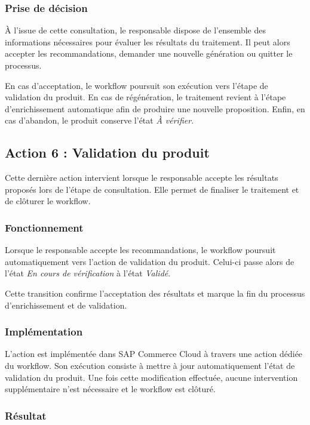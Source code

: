 \subsubsection{Prise de décision}

À l'issue de cette consultation, le responsable dispose de l'ensemble des informations nécessaires pour évaluer les résultats du traitement. Il peut alors accepter les recommandations, demander une nouvelle génération ou quitter le processus.

En cas d'acceptation, le workflow poursuit son exécution vers l'étape de validation du produit. En cas de régénération, le traitement revient à l'étape d'enrichissement automatique afin de produire une nouvelle proposition. Enfin, en cas d'abandon, le produit conserve l'état \textit{À vérifier}.

\subsection{Action 6 : Validation du produit}

Cette dernière action intervient lorsque le responsable accepte les résultats proposés lors de l'étape de consultation. Elle permet de finaliser le traitement et de clôturer le workflow.

\subsubsection{Fonctionnement}

Lorsque le responsable accepte les recommandations, le workflow poursuit automatiquement vers l'action de validation du produit. Celui-ci passe alors de l'état \textit{En cours de vérification} à l'état \textit{Validé}.

Cette transition confirme l'acceptation des résultats et marque la fin du processus d'enrichissement et de validation.

\subsubsection{Implémentation}

L'action est implémentée dans SAP Commerce Cloud à travers une action dédiée du workflow. Son exécution consiste à mettre à jour automatiquement l'état de validation du produit. Une fois cette modification effectuée, aucune intervention supplémentaire n'est nécessaire et le workflow est clôturé.

\subsubsection{Résultat}

